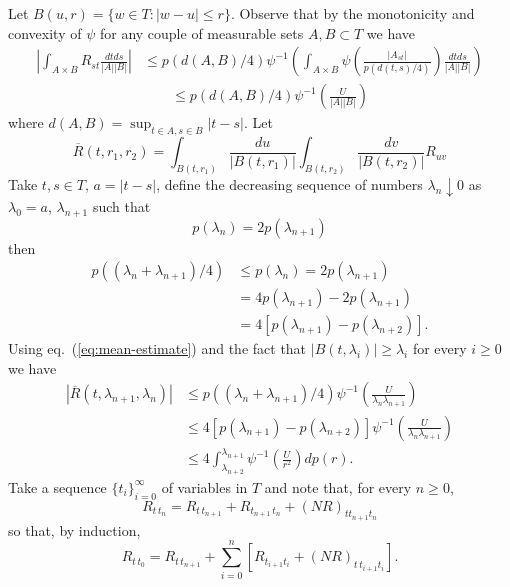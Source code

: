 \documentclass[a4paper,12pt,reqno]{amsproc}
\newcommand{\NN}{N}
\begin{document}
\proof
 Let $B(u,r) = \{ w \in T : |w-u| \le r \}$.
Observe that by the monotonicity and convexity of $\psi$ for any
couple of measurable sets $A,B \subset T$ we have
\begin{equation}
\label{eq:mean-estimate}
  \begin{split}
  \left|\int_{A\times B} R_{st} \frac{dt ds}{|A| |B|}\right|    
&  \le p(d(A,B)/4) \psi^{-1}\left(\int_{A\times B}
  \psi\left(\frac{|A_{st}|}{p(d(t,s)/4)}\right) \frac{dt ds}{|A| |B|}\right)
\\ & \qquad \le p(d(A,B)/4) \psi^{-1}\left(\frac{U}{|A| |B|}\right)
  \end{split}
\end{equation}
where $d(A,B) = \sup_{t \in A, s \in B}  |t-s|$.
Let
\begin{equation*}
  \overline R(t,r_1,r_2) = \int_{B(t,r_1)}   \frac{du}{| B(t,r_1)|
  }\int_{ B(t,r_2)}   \frac{ dv}{| B(t,r_2)|} R_{uv}
\end{equation*}
Take $t,s \in T$, $a = |t-s|$, define the decreasing sequence of numbers
$\lambda_n \downarrow 0$ as $\lambda_0 = a$, $\lambda_{n+1}$ such that
$$
p( \lambda_{n}) = 2 p( \lambda_{n+1})
$$
then
\begin{equation*}
  \begin{split}
p((\lambda_n+\lambda_{n+1})/4) & \le p(\lambda_n) = 2 p(\lambda_{n+1}) 
\\ & = 4    p(\lambda_{n+1}) - 2 p(\lambda_{n+1})
\\ & = 4 [   p(\lambda_{n+1})  - p(\lambda_{n+2})].
  \end{split}
\end{equation*}
Using eq.~(\ref{eq:mean-estimate}) and the fact that $|B(t,\lambda_i)|
\ge \lambda_i$ for every $i \ge 0$ we have
\begin{equation*}
  \begin{split}
|\overline R(t,\lambda_{n+1},\lambda_{n})| &   
\le p((\lambda_{n} +\lambda_{n+1})/4) 
 \psi^{-1}\left(\frac{U}{ \lambda_{n} \lambda_{n+1}}\right)   
\\ & \le 4 [   p(\lambda_{n+1})  - p(\lambda_{n+2})]
 \psi^{-1}\left(\frac{U}{ \lambda_{n} \lambda_{n+1}}\right)   
\\ & \le 4 \int_{\lambda_{n+2}}^{\lambda_{n+1}} 
 \psi^{-1}\left(\frac{U}{ r^2}\right)   dp(r).
  \end{split}
\end{equation*}
Take a sequence $\{ t_i \}_{i=0}^\infty$ of variables in $T$ and note that, for
every $n \ge 0$, 
$$
R_{t\,t_n} = R_{t\, t_{n+1}} + R_{t_{n+1}\, t_{n}} + (\NN R)_{t t_{n+1} t_n}
$$
so that, by induction,
$$
R_{t\, t_0} = R_{t\, t_{n+1}}+ \sum_{i=0}^{n} [R_{t_{i+1} t_i} + (\NN R)_{t\, t_{i+1} t_i}  ].
$$
\end{document}
